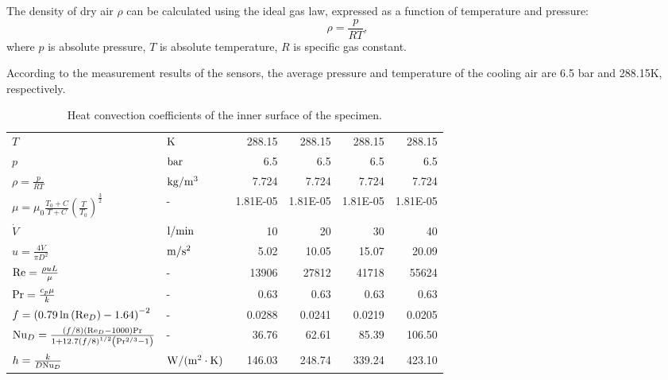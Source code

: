 \documentclass{article}
\begin{document}
The density of dry air $\rho$ can be calculated using the ideal gas law, expressed as a function of temperature and pressure:
\begin{equation}
\rho  = \frac{p}{{RT}},
\label{Equ:AirDensity}
\end{equation}
where
$p$ is absolute pressure,
$T$ is absolute temperature,
$R$ is specific gas constant.

According to the measurement results of the sensors, the average pressure and temperature of the cooling air are 6.5 bar and 288.15K, respectively.

\begin{table}[htbp]
  \begin{threeparttable}
  \centering
  \caption{Heat convection coefficients of the inner surface of the specimen.}
    \begin{tabular}{llrrrr}
    \toprule
    $T$   & ${\rm{K}}$ & 288.15  & 288.15  & 288.15  & 288.15  \\
    $p$   & ${\rm{bar}}$ & 6.5   & 6.5   & 6.5   & 6.5  \\
    $\rho  = \frac{p}{{RT}}$ \tnote{*1} & ${\rm{kg/}}{{\rm{m}}^{\rm{3}}}$ & 7.724 & 7.724 & 7.724 & 7.724 \\
    $\mu  = {\mu _0}\frac{{{T_0} + C}}{{T + C}}{\left( {\frac{T}{{{T_0}}}} \right)^{\frac{3}{2}}}$ \tnote{*2} & -     & 1.81E-05 & 1.81E-05 & 1.81E-05 & 1.81E-05 \\
    ${\dot V}$ & ${\rm{l/min}}$ & 10    & 20    & 30    & 40  \\
    $u = \frac{{4\dot V}}{{\pi {D^2}}}$ \tnote{*3} & ${\rm{m/}}{{\rm{s}}^2}$ & 5.02  & 10.05  & 15.07  & 20.09  \\
    ${\rm{Re}} = \frac{{\rho uL}}{\mu }$ \tnote{*4} & -     & 13906  & 27812  & 41718  & 55624  \\
    ${\rm{Pr}} = \frac{{{c_p}\mu }}{k}$ \tnote{*5} & -     & 0.63  & 0.63  & 0.63  & 0.63  \\
    $f = {\left( {0.79\ln \left( {{\rm{R}}{{\rm{e}}_D}} \right) - 1.64} \right)^{ - 2}}$ & -     & 0.0288  & 0.0241  & 0.0219  & 0.0205  \\
    ${\rm{N}}{{\rm{u}}_D} = \frac{{\left( {f/8} \right)\left( {{\rm{R}}{{\rm{e}}_D} - 1000} \right){\rm{Pr}}}}{{1 + 12.7{{(f/8)}^{1/2}}\left( {{\rm{P}}{{\rm{r}}^{2/3}} - 1} \right)}}$ & -     & 36.76  & 62.61  & 85.39  & 106.50  \\
    $h = \frac{k}{{D{\rm{N}}{{\rm{u}}_D}}}$ & ${\rm{W/(}}{{\rm{m}}^{\rm{2}}} \cdot {\rm{K)}}$ & 146.03  & 248.74  & 339.24  & 423.10  \\

\end{tabular}
\end{threeparttable}
\end{table}
\end{document}
